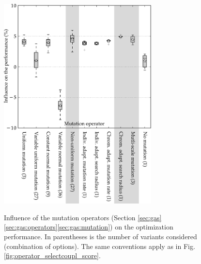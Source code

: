 \documentclass{ametsoc}
\begin{document}
\begin{figure}[t]
	\begin{center}
		\noindent\includegraphics[width=19pc,angle=0]{fig07.pdf}\\
	\end{center}
	\caption{Influence of the mutation operators (Section \ref{sec:gas}\ref{sec:gas:operators}\ref{sec:gas:mutation}) on the optimization performance. In parentheses is the number of variants considered (combination of options). The same conventions apply as in Fig. \ref{fig:operator_selectcoupl_score}.}
	\label{fig:operator_mutation_score}
\end{figure}
\end{document}
